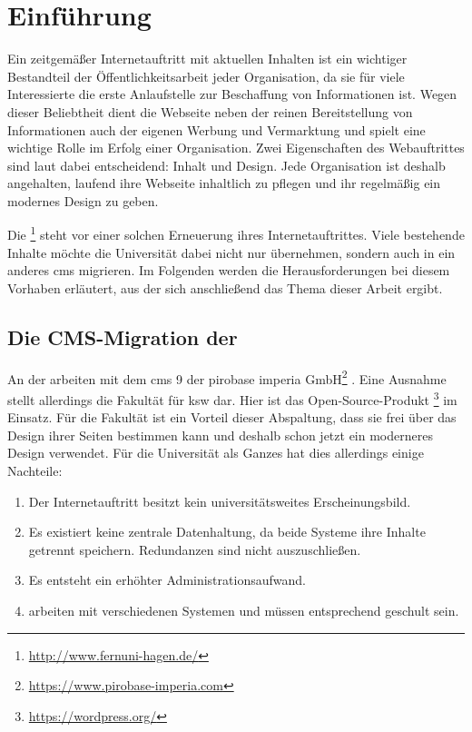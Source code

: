 \chapter{Einführung}
    \label{chapter:introduction}
    Ein zeitgemäßer Internetauftritt mit aktuellen Inhalten
    ist ein wichtiger Bestandteil der Öffentlichkeitsarbeit jeder Organisation,
    da sie für viele Interessierte die erste Anlaufstelle zur Beschaffung von Informationen ist.
    Wegen dieser Beliebtheit dient die Webseite neben der reinen Bereitstellung von Informationen
    auch der eigenen Werbung und Vermarktung und spielt eine wichtige Rolle im Erfolg einer Organisation.
    Zwei Eigenschaften des Webauftrittes sind laut \citet{sillence:onlineHealthSites} dabei
    entscheidend: Inhalt und Design.
    Jede Organisation ist deshalb angehalten, laufend ihre Webseite inhaltlich zu pflegen
    und ihr regelmäßig ein modernes Design zu geben.

    Die \fernUni\footnote{\url{http://www.fernuni-hagen.de/}}
    steht vor einer solchen Erneuerung ihres Internetauftrittes.
    Viele bestehende Inhalte möchte die Universität dabei nicht nur übernehmen,
    sondern auch in ein anderes \gls{cms} migrieren.
    Im Folgenden werden die Herausforderungen bei diesem Vorhaben erläutert,
    aus der sich anschließend das Thema dieser Arbeit ergibt.

    \section{Die CMS-Migration der \fernUni}
        \label{section:fernUniChallenges}
        An der {\fernUni} arbeiten {\editors} mit dem \gls{cms} {\imperia} 9
        der pirobase imperia GmbH\footnote{\url{https://www.pirobase-imperia.com}}
        \cite{fernUni:imperia}.
        Eine Ausnahme stellt allerdings die Fakultät für \gls{ksw} dar.
        Hier ist das Open-Source-Produkt {\wordpress}\footnote{\url{https://wordpress.org/}} im Einsatz.
        Für die Fakultät ist ein Vorteil dieser Abspaltung,
        dass sie frei über das Design ihrer Seiten bestimmen kann
        und deshalb schon jetzt ein moderneres Design verwendet.
        Für die Universität als Ganzes hat dies allerdings einige Nachteile:

        \begin{enumerate}
            \item   Der Internetauftritt besitzt kein universitätsweites Erscheinungsbild.
            \item   Es existiert keine zentrale Datenhaltung, da beide Systeme ihre Inhalte getrennt speichern.
                    Redundanzen sind nicht auszuschließen.
            \item   Es entsteht ein erhöhter Administrationsaufwand.
            \item   {\editors} arbeiten mit verschiedenen Systemen und müssen entsprechend geschult sein.
        \end{enumerate}

